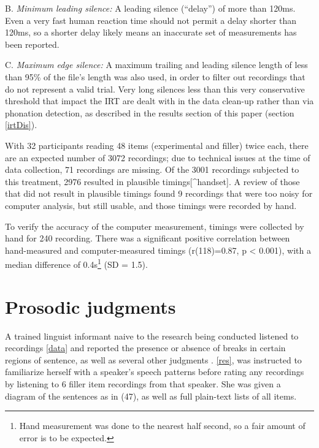 \documentclass[12pt,oneside]{book}
\let\rmarkdownfootnote\footnote%
\def\footnote{\protect\rmarkdownfootnote}
\begin{document}
B. \emph{Minimum leading silence:} A leading silence (``delay'') of more than 120ms. Even a very fast human reaction time should not permit a delay shorter than 120ms, so a shorter delay likely means an inaccurate set of measurements has been reported.

C. \emph{Maximum edge silence:} A maximum trailing and leading silence length of less than 95\% of the file's length was also used, in order to filter out recordings that do not represent a valid trial. Very long silences less than this very conservative threshold that impact the IRT are dealt with in the data clean-up rather than via phonation detection, as described in the results section of this paper (section \ref{irtDis}).

With 32 participants reading 48 items (experimental and filler) twice each, there are an expected number of 3072 recordings; due to technical issues at the time of data collection, 71 recordings are missing. Of the 3001 recordings subjected to this treatment, 2976 resulted in plausible timings{[}\^{}handset{]}. A review of those that did not result in plausible timings found 9 recordings that were too noisy for computer analysis, but still usable, and those timings were recorded by hand.

To verify the accuracy of the computer measurement, timings were collected by hand for 240 recording. There was a significant positive correlation between hand-measured and computer-measured timings (r(118)=0.87, p \textless{} 0.001), with a median difference of 0.4s\footnote{Hand measurement was done to the nearest half second, so a fair amount of error is to be expected.} (SD = 1.5).

\hypertarget{sita}{%
\section{Prosodic judgments}\label{sita}}

A trained linguist informant naive to the research being conducted listened to  recordings  \ref{data}\added{)} and reported the presence or absence of breaks in certain regions of  sentence, as well as several other judgments .  \ref{res},   was instructed to familiarize herself with a speaker's speech patterns before rating any recordings by listening to 6 filler item recordings from that speaker. She was given a diagram of the sentences as in (47), as well as full plain-text lists of all items.
\end{document}

